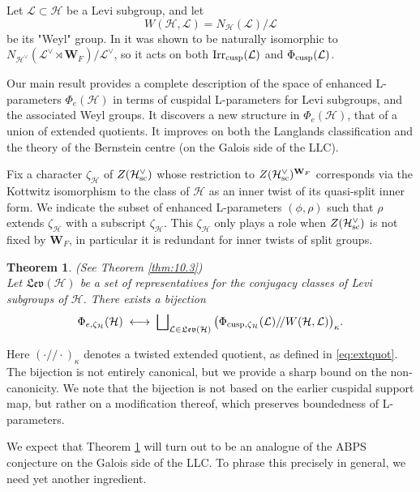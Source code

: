 \documentclass[11pt]{amsart}
\newtheorem{thmintro}{Theorem}
\theoremstyle{definition}
\newcommand{\mb}{\mathbf}
\newcommand{\mf}{\mathfrak}
\newcommand{\q}{/\!/}
\def\Irr{{\rm Irr}}
\def\cL{{\mathcal L}}
\def\cH{{\mathcal H}}
\def\sc{{\rm sc}}
\def\cusp{{\rm cusp}}
\begin{document}
Let $\cL \subset \cH$ be a Levi subgroup, and let 
\begin{equation*}
W(\cH,\cL) = N_{\cH}(\cL) / \cL
\end{equation*}
be its "Weyl" group. In \cite{ABPS7} it was shown to be naturally isomorphic to\\
$N_{\cH^\vee}(\cL^\vee \rtimes \mb W_F) / \cL^\vee$, so it acts on both 
$\Irr_\cusp (\cL)$ and $\Phi_\cusp (\cL)$.

Our main result provides a complete description of the space of enhanced
L-parameters $\Phi_e (\cH)$ in terms of cuspidal L-parameters for Levi subgroups,
and the associated Weyl groups. It discovers a new structure in $\Phi_e (\cH)$,
that of a union of extended quotients. It improves on both the Langlands 
classification and the theory of the Bernstein centre (on the Galois side of
the LLC).

Fix a character $\zeta_\cH$ of $Z(\cH^\vee_\sc)$ whose restriction to 
$Z(\cH^\vee_\sc)^{\mb W_F}$ corresponds via the Kottwitz isomorphism to the class 
of $\cH$ as an inner twist of its quasi-split inner form.
We indicate the subset of enhanced L-parameters 
$(\phi,\rho)$ such that $\rho$ extends $\zeta_\cH$ with a subscript $\zeta_\cH$.  
This $\zeta_\cH$ only plays a role when $Z(\cH^\vee_\sc)$ is not fixed by $\mb W_F$,
in particular it is redundant for inner twists of split groups.

\begin{thmintro}\label{thm:A} (See Theorem \ref{thm:10.3}) \\
Let $\mf{Lev}(\cH)$ be a set of representatives for the conjugacy classes of
Levi subgroups of $\cH$. There exists a bijection
\[
\Phi_{e,\zeta_\cH} (\cH) \; \longleftrightarrow \; \bigsqcup\nolimits_{\cL \in 
\mf{Lev}(\cH)} \big( \Phi_{\cusp,\zeta_\cH} (\cL) \q W(\cH,\cL) \big)_\kappa . 
\]
\end{thmintro}

Here $( \cdot \q \cdot )_\kappa$ denotes a twisted extended quotient, as defined 
in \eqref{eq:extquot}. The bijection is not entirely canonical, but we provide
a sharp bound on the non-canonicity. We note that the bijection is not based on
the earlier cuspidal support map, but rather on a modification thereof, which
preserves boundedness of L-parameters.

We expect that Theorem \ref{thm:A} will turn out to be an analogue of the ABPS 
conjecture \cite{ABPS7} on the Galois side of the LLC. To phrase this precisely in 
general, we need yet another ingredient. 
\end{document}
